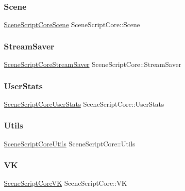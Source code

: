 \subsubsection{\texorpdfstring{Scene}{Scene}}
{\footnotesize\ttfamily \hyperlink{class_scene_script_core_scene}{Scene\+Script\+Core\+Scene} Scene\+Script\+Core\+::\+Scene}

\hypertarget{class_scene_script_core_a0ba07cbb5d7b28e5df319b379f63e5e7}{}\label{class_scene_script_core_a0ba07cbb5d7b28e5df319b379f63e5e7} 
\subsubsection{\texorpdfstring{Stream\+Saver}{StreamSaver}}
{\footnotesize\ttfamily \hyperlink{class_scene_script_core_stream_saver}{Scene\+Script\+Core\+Stream\+Saver} Scene\+Script\+Core\+::\+Stream\+Saver}

\hypertarget{class_scene_script_core_a40169903d7fe2efc189566db200be893}{}\label{class_scene_script_core_a40169903d7fe2efc189566db200be893} 
\subsubsection{\texorpdfstring{User\+Stats}{UserStats}}
{\footnotesize\ttfamily \hyperlink{class_scene_script_core_user_stats}{Scene\+Script\+Core\+User\+Stats} Scene\+Script\+Core\+::\+User\+Stats}

\hypertarget{class_scene_script_core_a69272e0a62ddf790bb0dfbdd2fec39ad}{}\label{class_scene_script_core_a69272e0a62ddf790bb0dfbdd2fec39ad} 
\subsubsection{\texorpdfstring{Utils}{Utils}}
{\footnotesize\ttfamily \hyperlink{class_scene_script_core_utils}{Scene\+Script\+Core\+Utils} Scene\+Script\+Core\+::\+Utils}

\hypertarget{class_scene_script_core_a6e7c70f03122723a455e75d60ba309d0}{}\label{class_scene_script_core_a6e7c70f03122723a455e75d60ba309d0} 
\subsubsection{\texorpdfstring{VK}{VK}}
{\footnotesize\ttfamily \hyperlink{class_scene_script_core_v_k}{Scene\+Script\+Core\+VK} Scene\+Script\+Core\+::\+VK}

